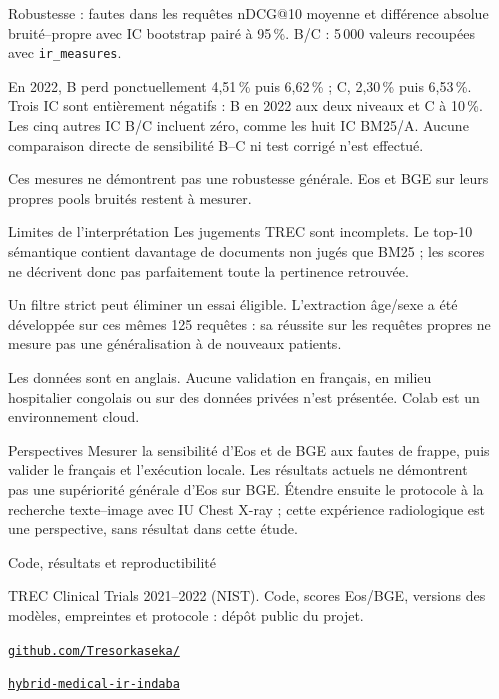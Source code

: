 \documentclass[final]{beamer}
\newlength{\sepwidth}
\newlength{\colwidth}
\newcommand{\separatorcolumn}{\begin{column}{\sepwidth}\end{column}}
\begin{document}
\begin{frame}[t]
\begin{columns}[t]
\begin{column}{\colwidth}
\begin{exampleblock}{Robustesse : fautes dans les requêtes}
{\small nDCG@10 moyenne et différence absolue bruité--propre avec IC bootstrap pairé à 95\,\%. B/C : 5\,000 valeurs recoupées avec \texttt{ir\_measures}.}

En 2022, B perd ponctuellement 4,51\,\% puis 6,62\,\% ; C, 2,30\,\% puis 6,53\,\%. Trois IC sont entièrement négatifs : B en 2022 aux deux niveaux et C à 10\,\%. Les cinq autres IC B/C incluent zéro, comme les huit IC BM25/A. Aucune comparaison directe de sensibilité B--C ni test corrigé n'est effectué.

Ces mesures ne démontrent pas une robustesse générale. Eos et BGE sur leurs propres pools bruités restent à mesurer.
\end{exampleblock}
\begin{block}{Limites de l'interprétation}
Les jugements TREC sont incomplets. Le top-10 sémantique contient davantage de documents non jugés que BM25 ; les scores ne décrivent donc pas parfaitement toute la pertinence retrouvée.

Un filtre strict peut éliminer un essai éligible. L'extraction âge/sexe a été développée sur ces mêmes 125 requêtes : sa réussite sur les requêtes propres ne mesure pas une généralisation à de nouveaux patients.

Les données sont en anglais. Aucune validation en français, en milieu hospitalier congolais ou sur des données privées n'est présentée. Colab est un environnement cloud.
\end{block}
\begin{block}{Perspectives}
Mesurer la sensibilité d'Eos et de BGE aux fautes de frappe, puis valider le français et l'exécution locale. Les résultats actuels ne démontrent pas une supériorité générale d'Eos sur BGE. Étendre ensuite le protocole à la recherche texte--image avec IU Chest X-ray ; cette expérience radiologique est une perspective, sans résultat dans cette étude.
\end{block}
\begin{block}{Code, résultats et reproductibilité}
\begin{minipage}[c]{0.80\linewidth}
{\small TREC Clinical Trials 2021--2022 (NIST). Code, scores Eos/BGE, versions des modèles, empreintes et protocole : dépôt public du projet.\par\smallskip
\href{https://github.com/Tresorkaseka/hybrid-medical-ir-indaba}{\texttt{github.com/Tresorkaseka/}}\par
\href{https://github.com/Tresorkaseka/hybrid-medical-ir-indaba}{\texttt{hybrid-medical-ir-indaba}}}
\end{minipage}\hfill
\begin{minipage}[c]{0.17\linewidth}
\centering
{}
\end{minipage}
\end{block}
\end{column}
\separatorcolumn
\end{columns}
\end{frame}
\end{document}
